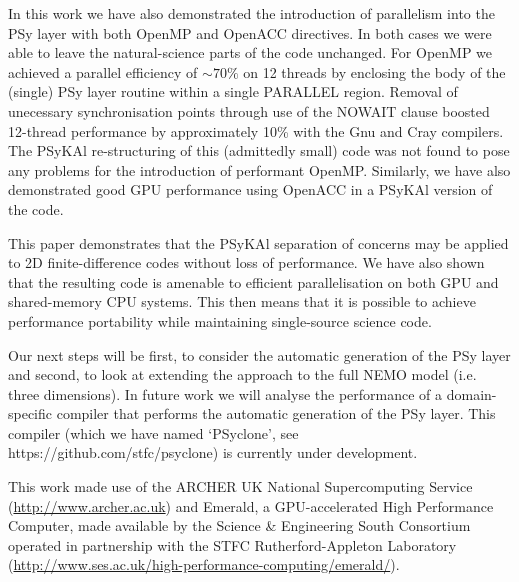 \documentclass[gmd, manuscript]{copernicus}
\begin{document}
In this work we have also demonstrated the introduction of parallelism
into the PSy layer with both OpenMP and OpenACC directives. In both
cases we were able to leave the natural-science parts of the code
unchanged. For OpenMP we achieved a parallel efficiency of $\sim70\%$
on 12 threads by enclosing the body of the (single) PSy layer routine
within a single PARALLEL region. Removal of unecessary synchronisation
points through use of the NOWAIT clause boosted 12-thread performance
by approximately 10\% with the Gnu and Cray compilers. The
{PS}y{KA}l re-structuring of this (admittedly small) code was not found
to pose any problems for the introduction of performant OpenMP.
Similarly, we have also demonstrated good GPU performance using OpenACC
in a {PS}y{KA}l version of the code.

This paper demonstrates that the {PS}y{KA}l separation of concerns may
be applied to 2D finite-difference codes without loss of
performance. We have also shown that the resulting code is amenable to
efficient parallelisation on both GPU and shared-memory CPU systems.
This then means that it is possible to achieve performance portability
while maintaining single-source science code.

Our next steps will be first, to consider the automatic generation of the
PSy layer and second, to look at extending the approach to the full NEMO
model (i.e. three dimensions). In future work we will analyse the
performance of a domain-specific compiler that performs the automatic
generation of the PSy layer. This compiler (which we have named
`PSyclone', see https://github.com/stfc/psyclone) is currently under
development.



\begin{acknowledgements}

This work made use of the ARCHER UK National Supercomputing Service
(\url{http://www.archer.ac.uk}) and Emerald, a GPU-accelerated High
Performance Computer, made available by the Science \& Engineering
South Consortium operated in partnership with the STFC
Rutherford-Appleton Laboratory
(\url{http://www.ses.ac.uk/high-performance-computing/emerald/}).

\end{acknowledgements}



\end{document}
